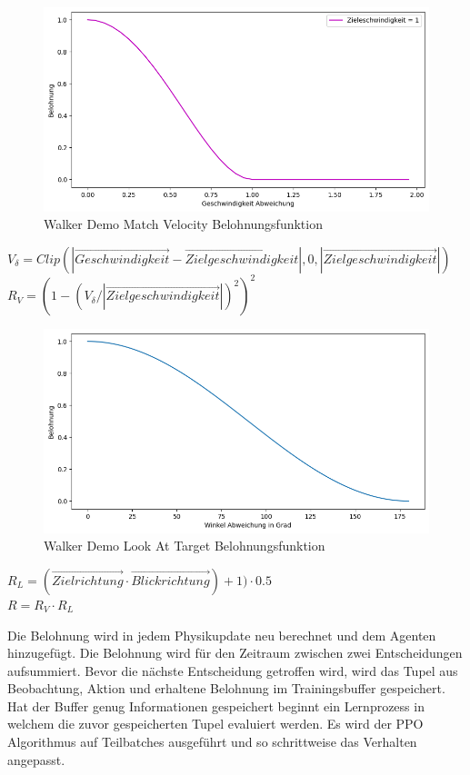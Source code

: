 \begin{figure}[H]
  \centering  
  \includegraphics[scale=0.5]{img/match_velocity_demo_vel1.png}
  \caption{Walker Demo Match Velocity Belohnungsfunktion}
  \label{fig:match_velocity_demo_vel1}
\end{figure}

$V_\delta=Clip(|\vec{Geschwindigkeit} - \vec{Zielgeschwindigkeit}|, 0, |\vec{Zielgeschwindigkeit}|)$ \\
$R_V=(1 - (V_\delta / |\vec{Zielgeschwindigkeit}|)^2)^2$ \\

\begin{figure}[H]
  \centering  
  \includegraphics[scale=0.5]{img/look_at_target_demo.png}
  \caption{Walker Demo Look At Target Belohnungsfunktion}
  \label{fig:look_at_target_demo}
\end{figure}

$R_L=(\vec{Zielrichtung} \cdot \vec{Blickrichtung})+ 1) \cdot 0.5$ \\
$R=R_V \cdot R_L$

Die Belohnung wird in jedem Physikupdate neu berechnet und dem Agenten hinzugefügt. Die Belohnung wird für den Zeitraum zwischen zwei Entscheidungen aufsummiert. Bevor die nächste Entscheidung getroffen wird, wird das Tupel aus Beobachtung, Aktion und erhaltene Belohnung im Trainingsbuffer gespeichert. Hat der Buffer genug Informationen gespeichert beginnt ein Lernprozess in welchem die zuvor gespeicherten Tupel evaluiert werden. Es wird der PPO Algorithmus auf Teilbatches ausgeführt und so schrittweise das Verhalten angepasst.

